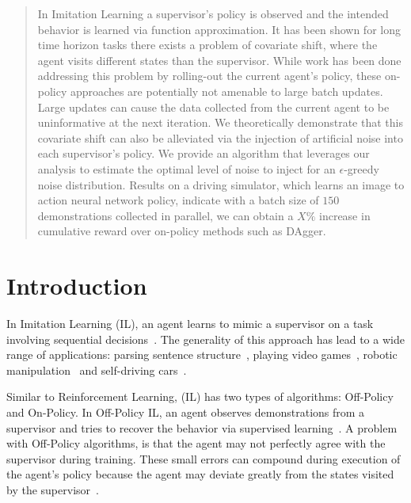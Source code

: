 \documentclass[conference]{article}
\begin{document}
\begin{abstract}
In Imitation Learning a supervisor’s policy is observed and the intended behavior is learned via function approximation. It has been shown for long time horizon tasks there exists a problem of covariate shift, where the agent visits different states than the supervisor. While work has been done addressing this problem by rolling-out the current agent's policy, these on-policy approaches are potentially not amenable to large batch updates.  Large updates can cause the data collected from the current agent to be uninformative at the next iteration.  We theoretically demonstrate that this covariate shift can also be alleviated via the injection of artificial noise into each supervisor’s policy. We provide an algorithm that leverages our analysis to estimate the optimal level of noise to inject for an $\epsilon$-greedy noise distribution.  Results on a driving simulator, which learns an image to action neural network policy, indicate with a batch size of $150$ demonstrations collected in parallel, we can obtain a $X\%$ increase in cumulative reward over on-policy methods such as DAgger. 
\end{abstract}


\section{Introduction}

In Imitation Learning (IL), an agent learns to mimic a supervisor on a task involving sequential decisions~\cite{argall2009survey}.  The generality of this approach has lead to a wide range of applications: parsing sentence structure~\cite{ballesteros2016training}, playing video games~\cite{NIPS2014_5421}, robotic manipulation~\cite{laskey2016robot} and self-driving cars~\cite{pomerleau1989alvinn}. 



Similar to Reinforcement Learning, (IL) has two types of algorithms: Off-Policy and On-Policy. In Off-Policy IL, an agent observes demonstrations from a supervisor and tries to recover the behavior via supervised learning~\cite{pomerleau1989alvinn}. A problem with Off-Policy algorithms, is that the agent may not perfectly agree with the supervisor during training. These small errors can compound during execution of the agent's policy because the agent may deviate greatly from the states visited by the supervisor~\cite{ross2010efficient}.
\end{document}
